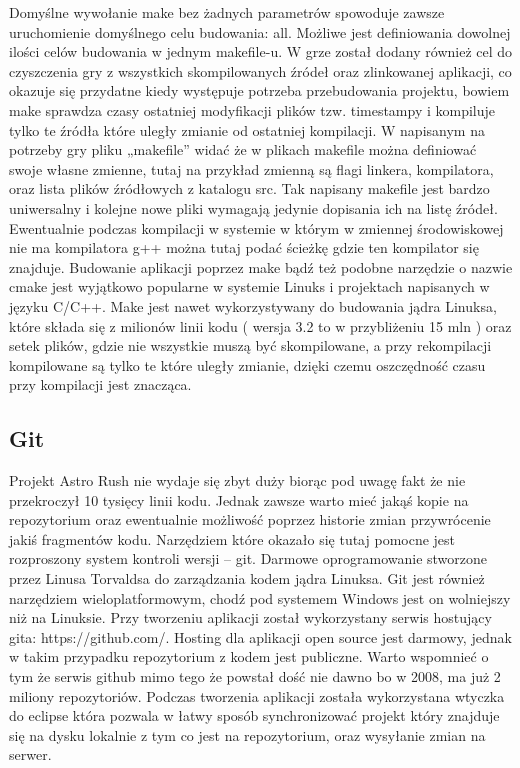 Domyślne wywołanie make bez żadnych parametrów spowoduje zawsze uruchomienie domyślnego celu budowania: all. Możliwe jest definiowania dowolnej ilości
celów budowania w jednym makefile-u. W grze został dodany również cel do czyszczenia gry z wszystkich skompilowanych źródeł oraz zlinkowanej
aplikacji, co okazuje się przydatne kiedy występuje potrzeba przebudowania projektu, bowiem make sprawdza czasy ostatniej modyfikacji  plików tzw.
timestampy i kompiluje tylko te źródła które uległy zmianie od ostatniej kompilacji.
	W napisanym na potrzeby gry pliku „makefile” widać że w plikach makefile można definiować swoje własne zmienne, tutaj na przykład zmienną są
flagi linkera, kompilatora, oraz lista plików źródłowych z katalogu src. Tak napisany makefile jest bardzo uniwersalny i kolejne nowe pliki wymagają
jedynie dopisania ich na listę źródeł. Ewentualnie podczas kompilacji w systemie w którym w zmiennej środowiskowej nie ma kompilatora g++ można tutaj
podać ścieżkę gdzie ten kompilator się znajduje.
	Budowanie aplikacji poprzez make bądź też podobne narzędzie o nazwie cmake jest wyjątkowo popularne w systemie Linuks i projektach napisanych
w języku C/C++. Make jest nawet wykorzystywany do budowania jądra Linuksa, które składa się z milionów linii kodu ( wersja 3.2 to w przybliżeniu 15
mln ) oraz setek plików, gdzie nie wszystkie muszą być skompilowane, a przy rekompilacji kompilowane są tylko te które uległy zmianie, dzięki czemu
oszczędność czasu przy kompilacji jest znacząca.


\subsection{Git}
Projekt Astro Rush nie wydaje się zbyt duży biorąc pod uwagę fakt że nie przekroczył 10 tysięcy linii kodu. Jednak zawsze warto mieć jakąś kopie na
repozytorium oraz ewentualnie możliwość poprzez historie  zmian przywrócenie jakiś fragmentów kodu. Narzędziem które okazało się tutaj pomocne jest
rozproszony system kontroli wersji – git. Darmowe oprogramowanie stworzone przez Linusa Torvaldsa do zarządzania kodem jądra Linuksa. Git jest również
narzędziem wieloplatformowym, chodź pod systemem Windows jest on wolniejszy niż na Linuksie. Przy tworzeniu aplikacji został wykorzystany serwis
hostujący gita: https://github.com/. Hosting dla aplikacji open source jest darmowy, jednak w takim przypadku repozytorium z kodem jest publiczne.
Warto wspomnieć o tym że serwis github mimo tego że powstał dość nie dawno bo w 2008, ma już 2 miliony repozytoriów.
	Podczas tworzenia aplikacji została wykorzystana wtyczka do eclipse która pozwala w łatwy sposób synchronizować projekt który znajduje się na
dysku lokalnie z tym co jest na repozytorium, oraz wysyłanie zmian na serwer.


